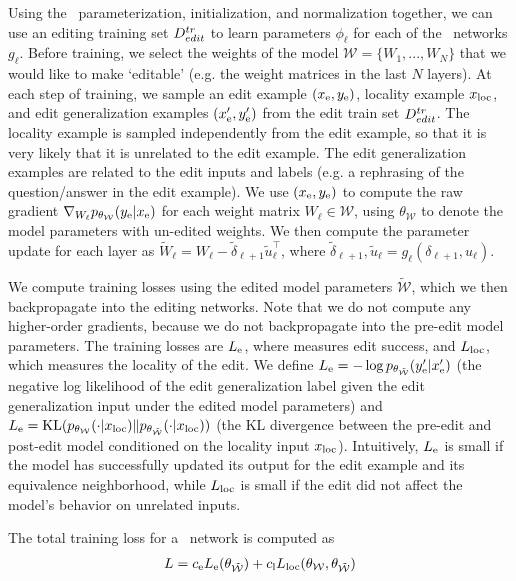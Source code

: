 \documentclass{article}
\begin{document}
Using the \name~parameterization, initialization, and normalization together, we can use an editing training set $D^{tr}_{edit}$ to learn parameters $\phi_\ell$ for each of the \name~networks $g_\ell$. Before training, we select the weights of the model $\mathcal{W}=\{W_1,...,W_N\}$ that we would like to make `editable' (e.g. the weight matrices in the last $N$ layers). At each step of training, we sample an edit example $(x_\text{e},y_\text{e})$, locality example $x_\text{loc}$, and edit generalization examples $(x_\text{e}',y_\text{e}')$ from the edit train set $D^{tr}_{edit}$. The locality example is sampled independently from the edit example, so that it is very likely that it is unrelated to the edit example. The edit generalization examples are related to the edit inputs and labels (e.g. a rephrasing of the question/answer in the edit example). We use $(x_\text{e},y_\text{e})$ to compute the raw gradient $\nabla_{W_\ell}p_{\theta_\mathcal{W}}(y_\text{e}|x_\text{e})$ for each weight matrix $W_\ell\in\mathcal{W}$, using $\theta_\mathcal{W}$ to denote the model parameters with un-edited weights. We then compute the parameter update for each layer as $\tilde W_\ell = W_\ell - \tilde\delta_{\ell+1}\tilde u_\ell^{\top}$, where $\tilde \delta_{\ell+1}, \tilde u_\ell = g_\ell(\delta_{\ell+1},u_\ell)$.

We compute training losses using the edited model parameters $\mathcal{\tilde W}$, which we then backpropagate into the editing networks. Note that we do not compute any higher-order gradients, because we do not backpropagate into the pre-edit model parameters. The training losses are $L_\text{e}$, where measures edit success, and $L_\text{loc}$, which measures the locality of the edit. We define $L_\text{e} = -\log p_{\theta_\mathcal{\tilde W}}(y_\text{e}'|x_\text{e}')$ (the negative log likelihood of the edit generalization label given the edit generalization input under the edited model parameters) and $L_\text{e} = \text{KL}(p_{\theta_\mathcal{W}}(\cdot|x_\text{loc}) \| p_{\theta_\mathcal{\tilde W}}(\cdot|x_\text{loc}))$ (the KL divergence between the pre-edit and post-edit model conditioned on the locality input $x_\text{loc}$). Intuitively, $L_\text{e}$ is small if the model has successfully updated its output for the edit example and its equivalence neighborhood, while $L_\text{loc}$ is small if the edit did not affect the model's behavior on unrelated inputs.

The total training loss for a \name~network is computed as
\begin{align}
    L = c_\text{e} L_\text{e}(\theta_\mathcal{\tilde W}) + c_\text{l} L_\text{loc}(\theta_\mathcal{W},\theta_\mathcal{\tilde W})
\end{align}
\end{document}

